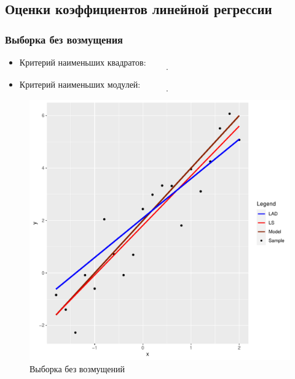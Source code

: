 \documentclass[a4paper]{article}
\begin{document}
\subsection{Оценки коэффициентов линейной регрессии}
\subsubsection{Выборка без возмущения}
\begin{itemize}
    \item Критерий наименьших квадратов:
    \[
    .
    \]
    \item Критерий наименьших модулей:
    \[
    .
    \]
\end{itemize}
\begin{figure}[H]
    \centering
    \includegraphics[width = 12 cm ]{LabSrcs/resources/usual_sample_regression.pdf}
    \caption{Выборка без возмущений}
    \label{fig:usr}
\end{figure}
\end{document}
